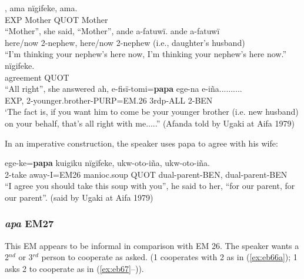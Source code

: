 \documentclass[output=paper]{langsci/langscibook}
\begin{document}

\begin{exe}
\ex \label{ex:eb64}
	\begin{xlist}
	\ex 
	, ama nïgifeke, ama.\\
	EXP Mother QUOT Mother\\
	\trans “Mother”, she said, “Mother”,
	\ex 
	\gll ande a-fatuwï. ande a-fatuwï\\
	here/now 2-nephew, here/now 2-nephew (i.e., daughter’s husband)\\
	\trans “I’m thinking your nephew’s here now, I’m thinking your nephew’s here now.”
	\ex
	 nïgifeke.\\
	agreement QUOT\\
	\trans “All right”, she answered
	\ex
	\gll ah, e-fisï-tomi=\textbf{papa} ege-na e-iña..........\\
	EXP, 2-younger.brother-PURP=EM.26 3rdp-ALL 2-BEN\\
	\trans ‘The fact is,  if you want him to come  be your  younger brother (i.e. new husband) on your behalf,  that’s all right with me.....” (Afanda told by Ugaki at Aifa 1979)
\end{xlist}
\end{exe}

In an imperative construction, the  speaker uses papa to agree with his wife:

\begin{exe}
	\ex \label{ex:eb65}
	\gll ege-ke=\textbf{papa} kuigiku nïgïfeke, ukw-oto-iña, ukw-oto-iña.\\
	2-take away-I=EM26 manioc.soup QUOT dual-parent-BEN, dual-parent-BEN\\
	\trans “I agree you should take this soup with you”, he said to her, “for our parent, for our parent”. (said by Ugaki at Aifa 1979)
\end{exe}

\subsubsection{\textit{apa} EM27} 
This EM appears to be informal in comparison with EM 26.  The speaker wants a 2$^{nd}$ or 3$^{rd}$ person to cooperate as asked. (1 cooperates with 2 as in (\ref{ex:eb66a}); 1 asks 2 to cooperate as in (\ref{ex:eb67}--\label{ex:eb68})).  
\end{document}
